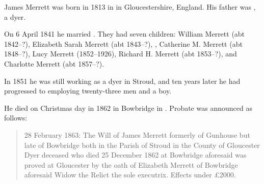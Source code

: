 
James Merrett\cite{HH-MMM-marriage} was born in 1813 in  in Gloucestershire, England.
His father was , a dyer.\cite{MerrettCoppinMarriageCert}

On 6 April 1841 he married .\cite{PeterKarpinski_2016-04-04,MerrettCoppinMarriageCert}
They had seven children: William Merrett (abt 1842--?), Elizabeth Sarah Merrett (abt 1843--?), , Catherine M. Merrett (abt 1848--?), Lucy Merrett (1852--1926), Richard H. Merrett (abt 1853--?), and Charlotte Merrett (abt 1857--?). 

In 1851 he was still working as a dyer in Stroud,\cite{Census1851Merrett}
and ten years later he had progressed to employing twenty-three men and a boy.\cite{Census1861Merrett}

He died on Christmas day in 1862 in Bowbridge in .
Probate was announced as follows:\cite{JamesMerrettProbate}

\begin{quotation}
28 February 1863: The Will of James Merrett formerly of Gunhouse but late of Bowbridge both in the Parish of Stroud in the County of Gloucester Dyer deceased who died 25 December 1862 at Bowbridge aforesaid was proved at Gloucester by the oath of Elizabeth Merrett of Bowbridge aforesaid Widow the Relict the sole executrix. Effects under \pounds2000.
\end{quotation}
